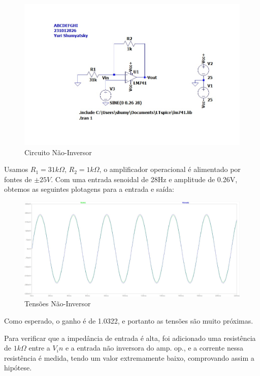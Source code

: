 \documentclass[10pt,twocolumn,letterpaper]{article}
\begin{document}
\begin{figure}[h]
\caption{Circuito Não-Inversor}
\begin{center}
\includegraphics[scale=0.2]{figuras/fig8}
\end{center}
\end{figure}

Usamos $R_1 =  31k\Omega$, $R_2=1k\Omega$, o amplificador operacional é alimentado por fontes de $\pm25V$. Com uma entrada senoidal de 28Hz e amplitude de 0.26V, obtemos as seguintes plotagens para a entrada e saída:

\begin{figure}[h]
\caption{Tensões Não-Inversor}
\begin{center}
\includegraphics[scale=0.15]{figuras/fig9}
\end{center}
\end{figure}

Como esperado, o ganho é de 1.0322, e portanto as tensões são muito próximas.

Para verificar que a impedância de entrada é alta, foi adicionado uma resistência de $1k\Omega$ entre a $V_in$ e a entrada não inversora do amp. op., e a corrente nessa resistência é medida, tendo um valor extremamente baixo, comprovando assim a hipótese.
\end{document}
